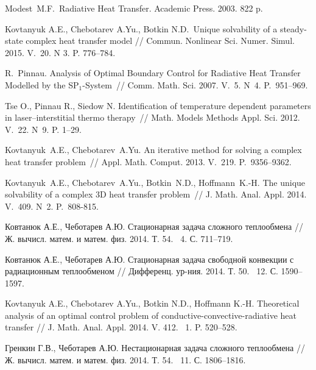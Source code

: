 \documentclass[12pt]{article}
\begin{document}
    \begin{thebibliography}{999}

        Modest~M.F.~Radiative Heat Transfer. Academic Press. 2003. 822 p.

        Kovtanyuk A.E., Chebotarev A.Yu., Botkin N.D.\ Unique solvability of a steady-state complex heat
        transfer model // Commun. Nonlinear Sci. Numer. Simul. 2015. V.~20. N 3. P. 776--784.

        R.~Pinnau. Analysis of Optimal Boundary Control for Radiative Heat
        Transfer Modelled by the SP$_1$-System~// Comm. Math. Sci. 2007. V.~5.
        N~4. P.~951--969.

        Tse O., Pinnau R., Siedow N. Identification of temperature
        dependent parameters in laser--interstitial thermo therapy~//
        Math. Models Methods Appl. Sci. 2012. V.~22. N~9. P. 1--29.

        Kovtanyuk~A.E., Chebotarev~A.Yu. An iterative method for solving a
        complex heat transfer problem~// Appl. Math. Comput. 2013. V.~219.
        P.~9356--9362.

        Kovtanyuk~A.E., Chebotarev~A.Yu., Botkin~N.D., Hoffmann~K.-H. The
        unique solvability of a complex 3D heat transfer problem~// J\@.
        Math. Anal. Appl. 2014. V.~409. N~2. P.~808-815.

        Ковтанюк А.Е., Чеботарев А.Ю. Стационарная задача сложного теплообмена
        // Ж. вычисл. матем. и матем. физ. 2014. Т. 54. \textnumero~4. С. 711--719.

        Ковтанюк А.Е., Чеботарев А.Ю. Стационарная задача свободной конвекции с радиационным теплообменом
        // Дифференц. ур-ния. 2014. Т. 50. \textnumero~12. С. 1590--1597.

        Kovtanyuk A.E., Chebotarev A.Yu., Botkin N.D., Hoffmann K.-H\@.
        Theoretical analysis of an optimal control problem of conductive-convective-radiative heat transfer // J. Math.
        Anal. Appl. 2014. V. 412. \textnumero~1. P. 520--528.

        Гренкин Г.В., Чеботарев А.Ю. Нестационарная задача сложного теплообмена
        // Ж. вычисл. матем. и матем. физ. 2014. Т. 54. \textnumero~11. С. 1806--1816.


\end{thebibliography}
\end{document}
